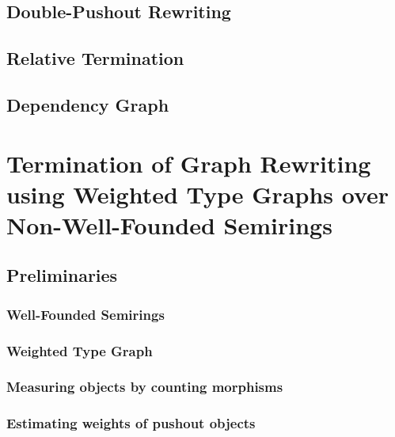 \documentclass{report}
\begin{document}
\section{Double-Pushout Rewriting} 
\label{sec:dpo}
 
\section{Relative Termination} 
\label{sec:relative_termination}

\section{Dependency Graph}


\chapter{Termination of Graph Rewriting using Weighted Type Graphs over Non-Well-Founded Semirings} 
\label{chap:nwf}



\section{Preliminaries}

\subsection{Well-Founded Semirings} 
\label{sec:well_founded_semiring}

 
\subsection{Weighted Type Graph} 
\label{sec:weighted_type_graph}


\subsection{Measuring objects by counting morphisms}
\label{sec:type_graph:wf:measuring_graphs}

  
\subsection{Estimating weights of pushout objects} 
\label{sec:type_graph:wf:weighing_pushout} 
   
\end{document}
